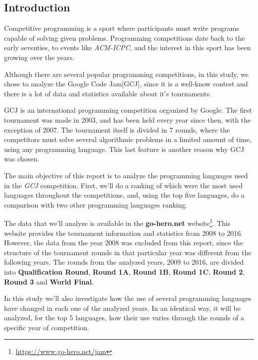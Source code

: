 \documentclass{article}
\begin{document}
\begin{multicols*}{2}


\section{Introduction}
Competitive programming is a sport where participants must write programs capable of solving given problems\cite{wiki_comp}. Programming competitions date back to the early seventies, to events like \textit{ACM-ICPC}, and the interest in this sport has been growing over the years.

Although there are several popular programming competitions, in this study, we chose to analyze the Google Code Jam[GCJ], since it is a well-know contest and there is a lot of data and statistics available about it's tournaments.


GCJ is an international programming competition\cite{gcj} organized by Google.
The first tournament was made in 2003, and has been held every year since then, with the exception of 2007. The tournament itself is divided in 7 rounds, where the competitors must solve several algorithmic problems in a limited amount of time, using any programming language. This last feature is another reason why GCJ was chosen.

The main objective of this report is to analyze the programming languages used in the \textit{GCJ} competition. First, we'll do a ranking of which were the most used languages throughout the competitions, and, using the top five languages, do a comparison with two other programming languages ranking.

The data that we'll analyze is available in the \textbf{go-hero.net} website\footnote{\url{https://www.go-hero.net/jam}}. This website provides the tournament information\cite{go-hero} and statistics from 2008 to 2016. However, the data from the year 2008 was excluded from this report, since the structure of the tournament rounds in that particular year was different from the following years. The rounds from the analyzed years, 2009 to 2016, are divided into \textbf{Qualification Round}, \textbf{Round 1A}, \textbf{Round 1B}, \textbf{Round 1C}, \textbf{Round 2}, \textbf{Round 3} and \textbf{World Final}.

In this study we'll also investigate how the use of several programming languages have changed in each one of the analyzed years. In an identical way, it will be analyzed, for the top 5 languages, how their use varies through the rounds of a specific year of competition.



\end{multicols*}
\end{document}
